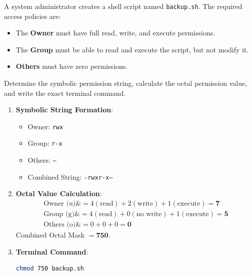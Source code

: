 \begin{example}
A system administrator creates a shell script named \texttt{backup.sh}. The required access policies are:
\begin{itemize}
    \item The \textbf{Owner} must have full read, write, and execute permissions.
    \item The \textbf{Group} must be able to read and execute the script, but not modify it.
    \item \textbf{Others} must have zero permissions.
\end{itemize}
Determine the symbolic permission string, calculate the octal permission value, and write the exact terminal command.

\begin{solutionbox}
\begin{enumerate}
    \item \textbf{Symbolic String Formation}:
    \begin{itemize}
        \item Owner: \texttt{rwx}
        \item Group: \texttt{r-x}
        \item Others: \texttt{---}
        \item Combined String: \texttt{-rwxr-x---}
    \end{itemize}
    \item \textbf{Octal Value Calculation}:
    \begin{align*}
        \text{Owner (u)} \&= 4 (\text{read}) + 2 (\text{write}) + 1 (\text{execute}) = \mathbf{7} \\
        \text{Group (g)} \&= 4 (\text{read}) + 0 (\text{no write}) + 1 (\text{execute}) = \mathbf{5} \\
        \text{Others (o)} \&= 0 + 0 + 0 = \mathbf{0}
    \end{align*}
    Combined Octal Mask $= \mathbf{750}$.
    \item \textbf{Terminal Command}:
    \begin{lstlisting}[language=bash]
chmod 750 backup.sh
    \end{lstlisting}
\end{enumerate}
\end{solutionbox}
\end{example}

